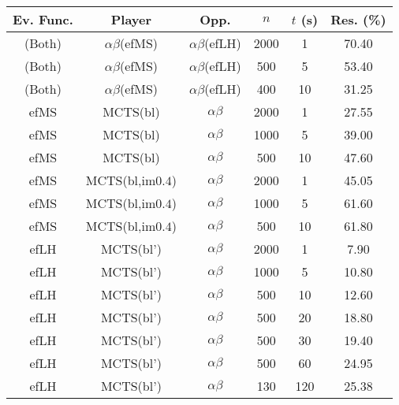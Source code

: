 \documentclass{article}
\begin{document}

\begin{table}[t]
\begin{center}
\begin{tabular}{ccccc|c}
Ev. Func.  & Player              & Opp.                 & $n$    & $t$ (s) & Res. (\%) \\
\hline
(Both)     & $\alpha\beta$(efMS) & $\alpha\beta$(efLH)  & 2000   & 1       & 70.40     \\
(Both)     & $\alpha\beta$(efMS) & $\alpha\beta$(efLH)  &  500   & 5       & 53.40     \\
(Both)     & $\alpha\beta$(efMS) & $\alpha\beta$(efLH)  &  400   & 10      & 31.25     \\
\hline
\hline
efMS       & MCTS(bl)              & $\alpha\beta$    & 2000   & 1       & 27.55     \\     
efMS       & MCTS(bl)              & $\alpha\beta$    & 1000   & 5       & 39.00     \\     
efMS       & MCTS(bl)              & $\alpha\beta$    &  500   & 10      & 47.60     \\     
\hline
efMS       & MCTS(bl,im$0.4$)     & $\alpha\beta$    & 2000   & 1       & 45.05     \\     
efMS       & MCTS(bl,im$0.4$)     & $\alpha\beta$    & 1000   & 5       & 61.60     \\     
efMS       & MCTS(bl,im$0.4$)     & $\alpha\beta$    &  500   & 10      & 61.80     \\     
\hline
\hline
efLH       & MCTS(bl')              & $\alpha\beta$    & 2000   & 1       &  7.90      \\     
efLH       & MCTS(bl')              & $\alpha\beta$    & 1000   & 5       & 10.80      \\     
efLH       & MCTS(bl')              & $\alpha\beta$    &  500   & 10      & 12.60      \\     
efLH       & MCTS(bl')              & $\alpha\beta$    &  500   & 20      & 18.80      \\     
efLH       & MCTS(bl')              & $\alpha\beta$    &  500   & 30      & 19.40      \\     
efLH       & MCTS(bl')              & $\alpha\beta$    &  500   & 60      & 24.95      \\     
efLH       & MCTS(bl')              & $\alpha\beta$    &  130   & 120     & 25.38      \\     

\end{tabular}
\end{center}
\end{table}
\end{document}
